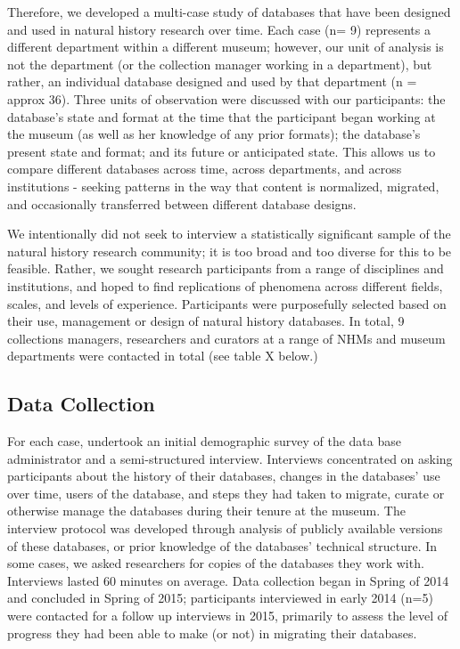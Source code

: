Therefore, we developed a multi-case study of databases that have been designed and used in natural history research over time. Each case (n= 9) represents a different department within a different museum; however, our unit of analysis is not the department (or the collection manager working in a department), but rather, an individual database designed and used by that department (n = approx 36). Three units of observation were discussed with our participants: the database's state and format at the time that the participant began working at the museum (as well as her knowledge of any prior formats); the database's present state and format; and its future or anticipated state. This allows us to compare different databases across time, across departments, and across institutions - seeking patterns in the way that content is normalized, migrated, and occasionally transferred between different database designs. 

We intentionally did not seek to interview a statistically significant sample of the natural history research community; it is too broad and too diverse for this to be feasible.  Rather, we sought research participants from a range of disciplines and institutions, and hoped to find replications of phenomena across different fields, scales, and levels of experience. Participants were purposefully selected based on their use, management or design of natural history databases. In total, 9 collections managers, researchers and curators at a range of NHMs and museum departments were contacted in total (see table X below.) 

\subsection{Data Collection}
For each case, undertook an initial demographic survey of the data base administrator and a semi-structured interview.  Interviews concentrated on asking participants about the history of their databases, changes in the databases’ use over time, users of the database, and steps they had taken to migrate, curate or otherwise manage the databases during their tenure at the museum. The interview protocol was developed through analysis of publicly available versions of these databases, or prior knowledge of the databases’ technical structure. In some cases, we asked researchers for copies of the databases they work with. Interviews lasted 60 minutes on average.  Data collection began in Spring of 2014 and concluded in Spring of 2015; participants interviewed in early 2014 (n=5) were contacted for a follow up interviews in 2015, primarily to assess the level of progress they had been able to make (or not) in migrating their databases.


